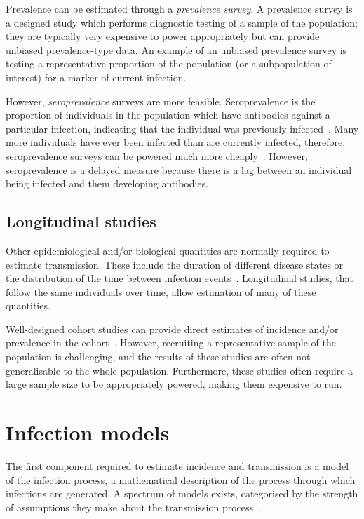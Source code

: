 \documentclass[thesis.tex]{subfiles}
\begin{document}
Prevalence can be estimated through a \emph{prevalence survey}.
A prevalence survey is a designed study which performs diagnostic testing of a sample of the population; they are typically very expensive to power appropriately but can provide unbiased prevalence-type data.
An example of an unbiased prevalence survey is testing a representative proportion of the population (or a subpopulation of interest) for a marker of current infection.

However, \emph{seroprevalence} surveys are more feasible.
Seroprevalence is the proportion of individuals in the population which have antibodies against a particular infection, indicating that the individual was previously infected~\autocite{cdcSeroprevalence}.
Many more individuals have ever been infected than are currently infected, therefore, seroprevalence surveys can be powered much more cheaply~\autocite{wuSeroprevSimulation}.
However, seroprevalence is a delayed measure because there is a lag between an individual being infected and them developing antibodies.

\subsection{Longitudinal studies}

Other epidemiological and/or biological quantities are normally required to estimate transmission.
These include the duration of different disease states or the distribution of the time between infection events~\autocite{wallingaGI,dankwaStructural}.
Longitudinal studies, that follow the same individuals over time, allow estimation of many of these quantities.

Well-designed cohort studies can provide direct estimates of incidence and/or prevalence in the cohort~\autocite[chapter 7]{lashModern}.
However, recruiting a representative sample of the population is challenging, and the results of these studies are often not generalisable to the whole population.
Furthermore, these studies often require a large sample size to be appropriately powered, making them expensive to run.

\section{Infection models}

The first component required to estimate incidence and transmission is a model of the infection process, a mathematical description of the process through which infections are generated.
A spectrum of models exists, categorised by the strength of assumptions they make about the transmission process~\autocite{beckerCOVIDmodels}.
\end{document}
